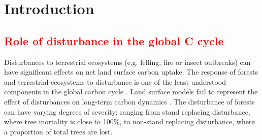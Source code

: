 \documentclass[12pt]{article}
\begin{document}

%
% 
% 
% 


\section{Introduction}
\subsection{\textcolor{red}{Role of disturbance in the global C cycle}}
Disturbances to terrestrial ecosystems (e.g. felling, fire or insect outbreaks) can have significant effects on net land surface carbon uptake. The response of forests and terrestrial ecosystems to disturbance is one of the least understood components in the global carbon cycle \citep{ciais2014carbon}. Land surface models fail to represent the effect of disturbances on long-term carbon dynamics \citep{running2008ecosystem}. The disturbance of forests can have varying degrees of severity; ranging from stand replacing disturbance, where tree mortality is close to 100\%, to non-stand replacing disturbance, where a proportion of total trees are lost.
\end{document}
